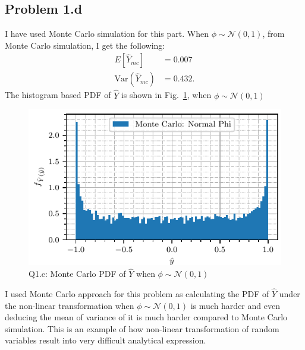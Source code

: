 \subsection*{Problem 1.d}
I have used Monte Carlo simulation for this part. When $\phi \sim \mathcal{N}(0,1)$, from Monte Carlo simulation, I get the following:
\begin{align*}
	E[\hat{Y}_{mc}] &= 0.007\\
	\text{Var}(\hat{Y}_{mc}) &= 0.432.
\end{align*}
The histogram based PDF of $\hat{Y}$ is shown in Fig.~\ref{fig:q1_norm_phi_mc}, when $\phi \sim \mathcal{N}(0,1)$
\begin{figure}[!h]
	\centering
	\includegraphics[scale=1.0,trim={0cm 0cm 0cm 0cm},clip]{./code/generatedPlots/q1_norm_phi_mc.pdf}
	\caption{Q1.c:  Monte Carlo PDF of $\hat{Y}$ when $\phi \sim \mathcal{N}(0,1)$}
	\label{fig:q1_norm_phi_mc}
\end{figure}


I used Monte Carlo approach for this problem as calculating the PDF of $\hat{Y}$ under the non-linear transformation when $\phi \sim \mathcal{N}(0,1)$ is much harder and even deducing the mean of variance of it is much harder compared to Monte Carlo simulation. This is an example of how non-linear transformation of random variables result into very difficult analytical expression. 